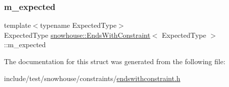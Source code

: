 \subsubsection{\texorpdfstring{m\_expected}{m\_expected}}
{\footnotesize\ttfamily template$<$typename Expected\+Type$>$ \\
Expected\+Type \mbox{\hyperlink{structsnowhouse_1_1EndsWithConstraint}{snowhouse\+::\+Ends\+With\+Constraint}}$<$ Expected\+Type $>$\+::m\+\_\+expected}



The documentation for this struct was generated from the following file\+:\begin{DoxyCompactItemize}
\item 
include/test/snowhouse/constraints/\mbox{\hyperlink{endswithconstraint_8h}{endswithconstraint.\+h}}\end{DoxyCompactItemize}

